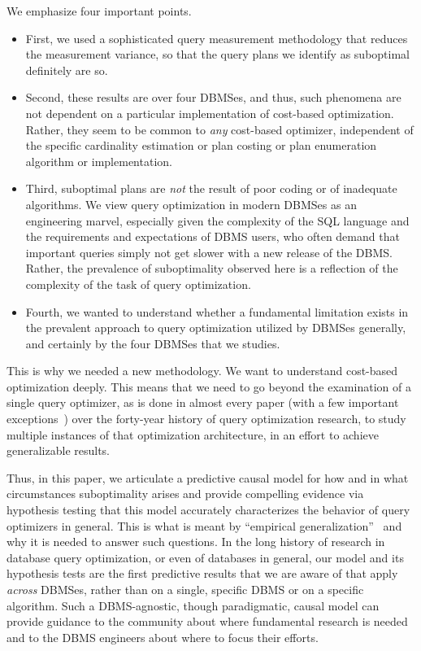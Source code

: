 \documentclass[prodmode,acmtods]{acmsmall}
\begin{document}
We emphasize four important points.
\begin{itemize}
\item First, we used a sophisticated query
measurement methodology that reduces the measurement variance, so that the
query plans we identify as suboptimal definitely are so.
\item Second, these
results are over four \hbox{DBMSes}, and thus, such phenomena are not dependent on
a particular implementation of cost-based optimization. Rather, they seem to
be common to {\em any} cost-based optimizer, independent of the specific
cardinality \hbox{estimation} or plan costing or plan enumeration algorithm or
implementation.
\item Third, suboptimal plans are {\em not} the result of poor
coding or of inadequate algorithms. We view query optimization in modern
\hbox{DBMSes} as an engineering marvel, especially given the complexity of the SQL
language and the requirements and expectations of \hbox{DBMS} users, who often
demand that important queries simply not get slower with a new release of
the \hbox{DBMS}. Rather, the prevalence of suboptimality observed here is a
reflection of the complexity of the task of query optimization.
\item Fourth, we wanted to understand whether a fundamental
limitation exists in the prevalent approach to query optimization utilized
by DBMSes generally, and certainly by the four DBMSes that we studies.
\end{itemize}

This is why we needed a new methodology. We want to understand cost-based
optimization deeply. This means that we need to go beyond the examination of
a single query optimizer, as is done in almost every paper (with a few
important exceptions~\cite{harish07,Haritsa10,Leis15}) over the forty-year history of
query optimization research, to study multiple instances of that
optimization architecture, in an effort to achieve generalizable results.

Thus, in this paper,
we articulate a predictive causal model for how
and in what circumstances suboptimality arises and provide compelling
evidence via \hbox{hypothesis} testing that this model accurately characterizes the
\hbox{behavior} of query optimizers in general. This is what is meant by ``empirical
generalization''~\cite{cohenbook} and why it is needed to answer such questions. In
  the long history of research in database query optimization, or even of
  databases in general, our model and its hypothesis tests are the first
  predictive results that we are aware of that apply {\em across}
  \hbox{DBMSes}, rather than on a single, specific \hbox{DBMS} or on a
  specific algorithm. Such a DBMS-agnostic, though paradigmatic, causal model can
\hbox{provide} guidance to the community about where fundamental research is needed
and to the \hbox{DBMS} engineers about where to focus their efforts.
\end{document}
